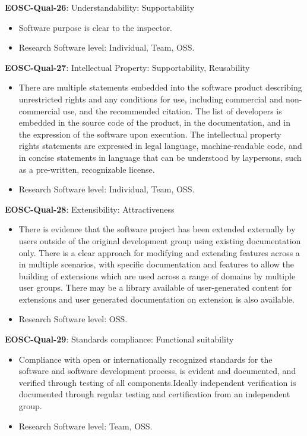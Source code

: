 \textbf{EOSC-Qual-26}: Understandability: Supportability

\begin{itemize}
    \item Software purpose is clear to the inspector. \cite{boehm_quantitative_1976}
    \item Research Software level: Individual, Team, OSS.
\end{itemize}

\textbf{EOSC-Qual-27}: Intellectual Property: Supportability, Reusability

\begin{itemize}
    \item There are multiple statements embedded into the software product describing unrestricted rights and any conditions for use, including commercial and non-commercial use, and the recommended citation. The list of developers is embedded in the source code of the product, in the documentation, and in the expression of the software upon execution. The intellectual property rights statements are expressed in legal language, machine-readable code, and in concise statements in language that can be understood by laypersons, such as a pre-written, recognizable license. \cite{shepherdson_cessda_2019}
    \item Research Software level: Individual, Team, OSS.
\end{itemize}

\textbf{EOSC-Qual-28}: Extensibility: Attractiveness

\begin{itemize}
    \item There is evidence that the software project has been extended externally by users outside of the original development group using existing documentation only. There is a clear approach for modifying and extending features across a in multiple scenarios, with specific documentation and features to allow the building of extensions which are used across a range of domains by multiple user groups. There may be a library available of user-generated content for extensions and user generated documentation on extension is also available. \cite{shepherdson_cessda_2019}
    \item Research Software level: OSS.
\end{itemize}

\textbf{EOSC-Qual-29}: Standards compliance: Functional suitability

\begin{itemize}
    \item Compliance with open or internationally recognized standards for the software and software development process, is evident and documented, and verified through testing of all components.Ideally independent verification is documented through regular testing and certification from an independent group. \cite{shepherdson_cessda_2019}
    \item Research Software level: Team, OSS.
\end{itemize}

